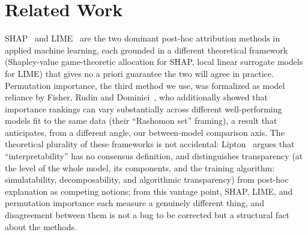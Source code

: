 \documentclass[11pt,twoside,a4paper]{article}
\begin{document}
\section{Related Work}

SHAP~\citep{lundberg2017unified} and LIME~\citep{ribeiro2016why} are the two dominant post-hoc attribution methods in applied machine learning, each grounded in a different theoretical framework (Shapley-value game-theoretic allocation for SHAP, local linear surrogate models for LIME) that gives no a priori guarantee the two will agree in practice. Permutation importance, the third method we use, was formalized as model reliance by Fisher, Rudin and Dominici~\citep{fisher2019models}, who additionally showed that importance rankings can vary substantially across different well-performing models fit to the same data (their ``Rashomon set'' framing), a result that anticipates, from a different angle, our between-model comparison axis. The theoretical plurality of these frameworks is not accidental: Lipton~\citep{lipton2018mythos} argues that ``interpretability'' has no consensus definition, and distinguishes transparency (at the level of the whole model, its components, and the training algorithm: simulatability, decomposability, and algorithmic transparency) from post-hoc explanation as competing notions; from this vantage point, SHAP, LIME, and permutation importance each measure a genuinely different thing, and disagreement between them is not a bug to be corrected but a structural fact about the methods.
\end{document}
